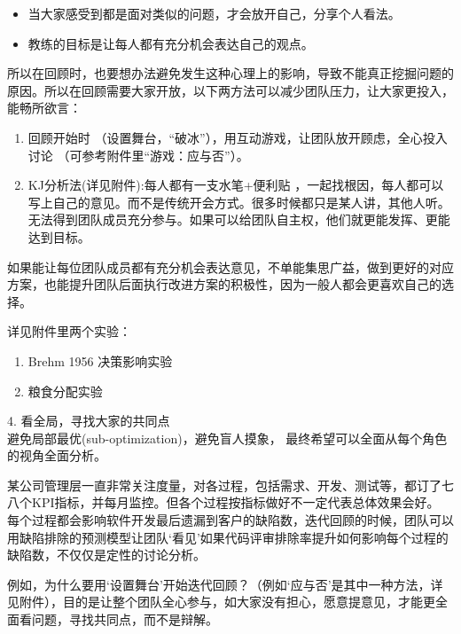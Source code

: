 \begin{itemize}
\tightlist
\item
  当大家感受到都是面对类似的问题，才会放开自己，分享个人看法。
\item
  教练的目标是让每人都有充分机会表达自己的观点。
\end{itemize}

所以在回顾时，也要想办法避免发生这种心理上的影响，导致不能真正挖掘问题的原因。所以在回顾需要大家开放，以下两方法可以减少团队压力，让大家更投入，能畅所欲言：

\begin{enumerate}
\tightlist
\item
  回顾开始时
  （设置舞台，``破冰''），用互动游戏，让团队放开顾虑，全心投入讨论
  （可参考附件里``游戏：应与否''）。
\item
  KJ分析法(详见附件):每人都有一支水笔+便利贴 ，一起找根因，每人都可以写上自己的意见。而不是传统开会方式。很多时候都只是某人讲，其他人听。无法得到团队成员充分参与。如果可以给团队自主权，他们就更能发挥、更能达到目标。\\
\end{enumerate}

如果能让每位团队成员都有充分机会表达意见，不单能集思广益，做到更好的对应方案，也能提升团队后面执行改进方案的积极性，因为一般人都会更喜欢自己的选择。

详见附件里两个实验：

\begin{enumerate}
\tightlist
\item
  Brehm 1956 决策影响实验
\item
  粮食分配实验
\end{enumerate}


4. 看全局，寻找大家的共同点\\
避免局部最优(sub-optimization)，避免盲人摸象，
最终希望可以全面从每个角色的视角全面分析。

某公司管理层一直非常关注度量，对各过程，包括需求、开发、测试等，都订了七八个KPI指标，并每月监控。但各个过程按指标做好不一定代表总体效果会好。
每个过程都会影响软件开发最后遗漏到客户的缺陷数，迭代回顾的时候，团队可以用缺陷排除的预测模型让团队`看见'如果代码评审排除率提升如何影响每个过程的缺陷数，不仅仅是定性的讨论分析。

例如，为什么要用`设置舞台'开始迭代回顾？（例如`应与否'是其中一种方法，详见附件），目的是让整个团队全心参与，如大家没有担心，愿意提意见，才能更全面看问题，寻找共同点，而不是辩解。

